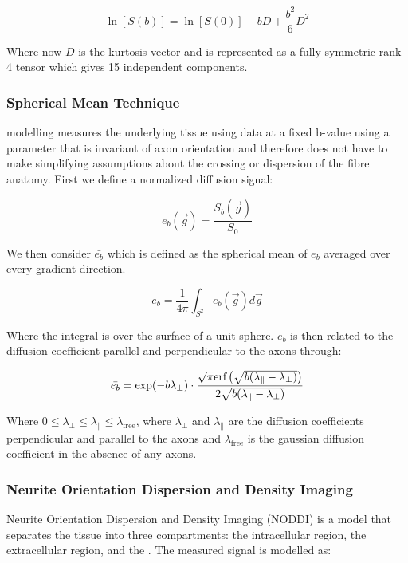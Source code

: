 \begin{equation}
    \ln[S(b)] = \ln[S(0)] - b D + \frac{b^2}{6} D^2
\end{equation}

Where now $D$ is the kurtosis vector and is represented as a fully symmetric rank 4 tensor which gives 15 independent components. \cite{jensen2005diffusional}

\subsubsection{Spherical Mean Technique}
\smt modelling measures the underlying tissue using data at a fixed b-value using a parameter that is invariant of axon orientation and therefore does not have to make simplifying assumptions about the crossing or dispersion of the fibre anatomy. First we define a normalized diffusion signal:

\begin{equation}
    e_b(\vec{g}) = \frac{S_b(\vec{g})}{S_0}
\end{equation}

We then consider $\bar{e_b}$ which is defined as the spherical mean of $e_b$ averaged over every gradient direction.

\begin{equation}
    \bar{e_b} = \frac{1}{4\pi} \int_{S^2} e_b(\vec{g}) d\vec{g}
\end{equation}

Where the integral is over the surface of a unit sphere. $\bar{e_b}$ is then related to the diffusion coefficient parallel and perpendicular to the axons through:

\begin{equation}
    \bar{e_b} = \exp(-b \lambda_\perp) \cdot
    \frac{\sqrt{\pi}\text{erf} \left(\sqrt{b (\lambda_\parallel - \lambda_\perp)}\right)}
    {2 \sqrt{b (\lambda_\parallel - \lambda_\perp)}}
\end{equation}

Where $0 \leq \lambda_\perp \leq \lambda_\parallel \leq \lambda_\text{free}$, where $\lambda_\perp$ and $\lambda_\parallel$ are the diffusion coefficients perpendicular and parallel to the axons and $\lambda_\text{free}$ is the gaussian diffusion coefficient in the absence of any axons. \cite{kaden2016quantitative}

\subsubsection{Neurite Orientation Dispersion and Density Imaging}
Neurite Orientation Dispersion and Density Imaging (NODDI) is a model that separates the tissue into three compartments: the intracellular region, the extracellular region, and the \csf. The measured signal is modelled as:

